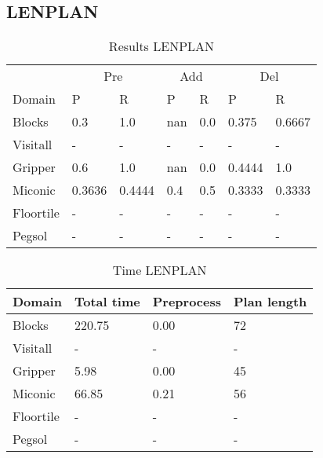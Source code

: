 \documentclass[]{article}
\begin{document}
\subsection{LENPLAN}
\begin{table}[H]
	\caption{Results LENPLAN}
	\label{tab:results_lenplan}
	\begin{center}
		\begin{tabular}{l|l|l|l|l|l|l|}
			& \multicolumn{2}{|c|}{Pre} & \multicolumn{2}{|c|}{Add} & \multicolumn{2}{|c|}{Del}  \\ \cline{2-7}			 
			Domain & P & R & P & R & P & R \\
			\hline
			Blocks & 0.3 & 1.0 & nan & 0.0 & 0.375 & 0.6667 \\
			Visitall & - & - & - & - & - & - \\
			Gripper & 0.6 & 1.0 & nan & 0.0 & 0.4444 & 1.0 \\
			Miconic & 0.3636 & 0.4444 & 0.4 & 0.5 & 0.3333 & 0.3333 \\
			Floortile & - & - & - & - & - & - \\
			Pegsol & - & - & - & - & - & - \\
		\end{tabular}
	\end{center}	
\end{table}

\begin{table}[H]
	\caption{Time LENPLAN}
	\label{tab:time_lenplan}
	\begin{center}
		\begin{tabular}{l|l|l|l|}			 
			Domain & Total time & Preprocess & Plan length  \\
			\hline
			Blocks & 220.75 & 0.00 & 72  \\
			Visitall & - & - & -  \\
			Gripper & 5.98 & 0.00 & 45  \\
			Miconic & 66.85 & 0.21 & 56  \\
			Floortile & - & - & - \\
			Pegsol & - & - & - \\
		\end{tabular}
	\end{center}	
\end{table}
\end{document}
